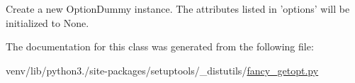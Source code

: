 \begin{DoxyVerb}Create a new OptionDummy instance.  The attributes listed in
'options' will be initialized to None.\end{DoxyVerb}
 

The documentation for this class was generated from the following file\+:\begin{DoxyCompactItemize}
\item 
venv/lib/python3./site-\/packages/setuptools/\+\_\+distutils/\hyperlink{fancy__getopt_8py}{fancy\+\_\+getopt.\+py}\end{DoxyCompactItemize}
